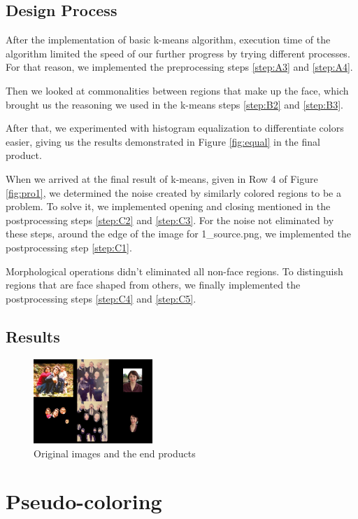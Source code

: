 \documentclass[conference]{IEEEtran}
\begin{document}
\subsection{Design Process}
After the implementation of basic k-means algorithm, execution time of the algorithm limited the speed of our further progress by trying different processes. For that reason, we implemented the preprocessing steps \ref{step:A3} and \ref{step:A4}.

Then we looked at commonalities between regions that make up the face, which brought us the reasoning we used in the k-means steps \ref{step:B2} and \ref{step:B3}.

After that, we experimented with histogram equalization to differentiate colors easier, giving us the results demonstrated in Figure \ref{fig:equal} in the final product.

When we arrived at the final result of k-means, given in Row 4 of Figure \ref{fig:pro1}, we determined the noise created by similarly colored regions to be a problem. To solve it, we implemented opening and closing mentioned in the postprocessing steps \ref{step:C2} and \ref{step:C3}. For the noise not eliminated by these steps, around the edge of the image for 1\_source.png, we implemented the postprocessing step \ref{step:C1}.

Morphological operations didn't eliminated all non-face regions. To distinguish regions that are face shaped from others, we finally implemented the postprocessing steps \ref{step:C4} and \ref{step:C5}.
\subsection{Results}
\begin{figure}[h]
    \centering
    \includegraphics[width=0.4\textwidth]{resources/End Result Compare.jpeg}
    \caption{Original images and the end products}
    \label{fig:end}
\end{figure}
\section{Pseudo-coloring}
\end{document}
